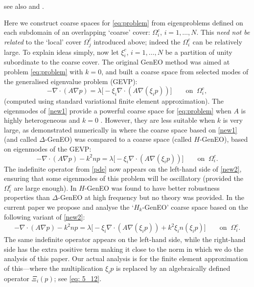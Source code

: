 \documentclass[numbers,webpdf,imaiai]{ima-authoring-template}%
\theoremstyle{thmstyletwo}%
\numberwithin{equation}{section}
\numberwithin{equation}{section}
\renewcommand{\kappa}{k}
\begin{document}
see also \cite{Spillane:2014:ARC} and \cite{Galvis:2018:ODD}. {Here we construct coarse spaces  for \eqref{eq:problem}
from eigenproblems defined on each subdomain of an  overlapping `coarse' cover:  $\Omega_i^c$, $i=1,\ldots,N$.
This \textit{need not be related} to the `local' cover  $\Omega_j^\ell$ introduced above;
indeed the $\Omega_i^c$ can be  relatively large.
To explain ideas simply, now let $\xi_i^c$,  $i=1,\ldots,N$  be a partition of unity subordinate to the coarse cover.
The original GenEO method was aimed at  problem \eqref{eq:problem} with $k = 0$, and built a coarse space  
from selected modes of the generalised eigenvalue problem (GEVP):
\begin{equation} \label{new1} 
	-\nabla \cdot (A \nabla p) =  \lambda \bigl[-\xi_i \nabla \cdot (A \nabla (\xi_i  p))\bigr] \qquad \text{on} \;\; \Omega_i^c,
\end{equation} 
(computed using standard variational finite element approximation).  The eigenmodes of \eqref{new1} provide
a powerful coarse space for \eqref{eq:problem} when $A$ is highly heterogeneous and $k = 0$ \cite{Spillane:2014:ARC}.
However, they are less suitable when $k$ is very large, as demonstrated numerically in
\cite{Bootland:2021:ACS,Bootland:2022:GCS} where the coarse space based on \eqref{new1} (and called  $\Delta$-GenEO) 
was compared to a coarse space (called $H$-GenEO), based on eigenmodes of the GEVP:
\begin{equation} \label{new2} 
	-\nabla \cdot (A \nabla p) - k^2 n p  =  \lambda \bigl[-\xi_i \nabla \cdot (A \nabla (\xi_i  p))\bigr] \qquad \text{on} \;\; \Omega_i^c. 
\end{equation}
The indefinite operator from \eqref{pde} now appears on the left-hand side of \eqref{new2}, ensuring
that some eigenmodes of this problem will be oscillatory (provided the $\Omega_i^c$ are large enough). 
In \cite{Bootland:2021:ACS,Bootland:2022:GCS} $H$-GenEO was found to have better robustness properties than $\Delta$-GenEO 
at high frequency but no theory was provided. 
In the current paper we propose and  analyse the `$H_\kappa$-GenEO' coarse space based on the following variant of \eqref{new2}:
\begin{align} \label{new3} 
	-\nabla \cdot (A \nabla p) - k^2 n p  = \lambda \bigl[-\xi_i \nabla \cdot (A \nabla (\xi_i  p)) + k^2 \xi_i n (\xi_i p) \bigr]  
	\qquad \text{on} \;\; \Omega_i^c. 
\end{align}
The same indefinite operator appears on the left-hand side, while the right-hand side has the extra positive term 
making it close to the norm in which we do the analysis of this paper. 
Our actual analysis is for the finite element approximation of this---where the multiplication $\xi_i p$ 
is replaced by an algebraically defined operator $\Xi_i(p)$; see \eqref{eq: 5_12}.       

}
\end{document}

